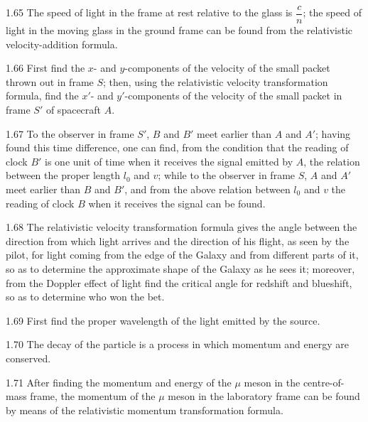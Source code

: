 \begin{hint}{1.65}
The speed of light in the frame at rest relative to the glass is $\dfrac{c}{n}$; the speed of light in the moving glass in the ground frame can be found from the relativistic velocity-addition formula.
\end{hint}

\begin{hint}{1.66}
First find the $x$- and $y$-components of the velocity of the small packet thrown out in frame $S$; then, using the relativistic velocity transformation formula, find the $x'$- and $y'$-components of the velocity of the small packet in frame $S'$ of spacecraft $A$.
\end{hint}

\begin{hint}{1.67}
To the observer in frame $S'$, $B$ and $B'$ meet earlier than $A$ and $A'$; having found this time difference, one can find, from the condition that the reading of clock $B'$ is one unit of time when it receives the signal emitted by $A$, the relation between the proper length $l_0$ and $v$; while to the observer in frame $S$, $A$ and $A'$ meet earlier than $B$ and $B'$, and from the above relation between $l_0$ and $v$ the reading of clock $B$ when it receives the signal can be found.
\end{hint}

\begin{hint}{1.68}
The relativistic velocity transformation formula gives the angle between the direction from which light arrives and the direction of his flight, as seen by the pilot, for light coming from the edge of the Galaxy and from different parts of it, so as to determine the approximate shape of the Galaxy as he sees it; moreover, from the Doppler effect of light find the critical angle for redshift and blueshift, so as to determine who won the bet.
\end{hint}

\begin{hint}{1.69}
First find the proper wavelength of the light emitted by the source.
\end{hint}

\begin{hint}{1.70}
The decay of the particle is a process in which momentum and energy are conserved.
\end{hint}

\begin{hint}{1.71}
After finding the momentum and energy of the $\mu$ meson in the centre-of-mass frame, the momentum of the $\mu$ meson in the laboratory frame can be found by means of the relativistic momentum transformation formula.
\end{hint}

